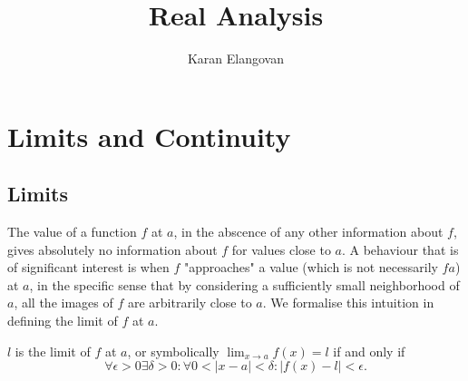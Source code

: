 \documentclass[]{article}
\title{Real Analysis}
\author{Karan Elangovan}
\begin{document}
\maketitle

\doublespacing
\tableofcontents

\section{Limits and Continuity}

\subsection{Limits}

The value of a function $f$ at $a$, in the abscence of any other information about $f$, gives absolutely no information about $f$ for values close to $a$. A behaviour that is of significant interest is when $f$ "approaches" a value (which is not necessarily $f a$) at $a$, in the specific sense that by considering a sufficiently small neighborhood of $a$, all the images of $f$ are arbitrarily close to $a$. We formalise this intuition in defining the limit of $f$ at $a$.

\begin{defi}[Limit]
		$l$ is the limit of $f$ at $a$, or symbolically $\lim_{x\to a} f(x) = l$ if and only if
		\[
				\forall \epsilon > 0 \exists \delta > 0: \forall 0 < |x - a| < \delta: |f(x) - l| < \epsilon
		.\] 
\end{defi}
\end{document}
